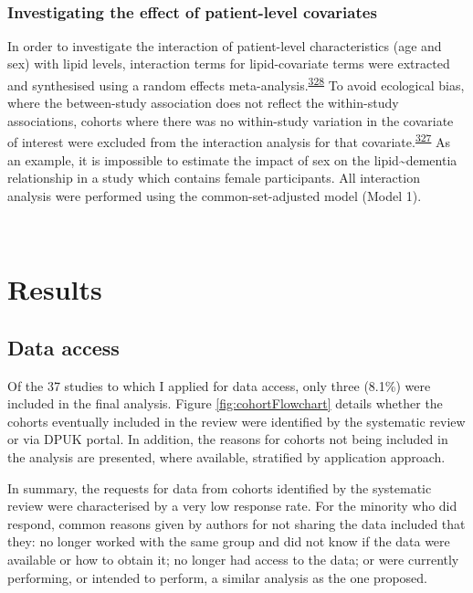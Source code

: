 \documentclass[a4paper, twoside]{templates/ociamthesis}
\begin{document}
~

\hypertarget{investigating-the-effect-of-patient-level-covariates}{%
\subsubsection{Investigating the effect of patient-level covariates}\label{investigating-the-effect-of-patient-level-covariates}}

In order to investigate the interaction of patient-level characteristics (age and sex) with lipid levels, interaction terms for lipid-covariate terms were extracted and synthesised using a random effects meta-analysis.\textsuperscript{\protect\hyperlink{ref-fisher2017}{328}} To avoid ecological bias, where the between-study association does not reflect the within-study associations, cohorts where there was no within-study variation in the covariate of interest were excluded from the interaction analysis for that covariate.\textsuperscript{\protect\hyperlink{ref-burke2017}{327}} As an example, it is impossible to estimate the impact of sex on the lipid\textasciitilde dementia relationship in a study which contains female participants. All interaction analysis were performed using the common-set-adjusted model (Model 1).

~

\hypertarget{results-2}{%
\section{Results}\label{results-2}}

\hypertarget{data-access}{%
\subsection{Data access}\label{data-access}}

Of the 37 studies to which I applied for data access, only three (8.1\%) were included in the final analysis. Figure \ref{fig:cohortFlowchart} details whether the cohorts eventually included in the review were identified by the systematic review or via DPUK portal. In addition, the reasons for cohorts not being included in the analysis are presented, where available, stratified by application approach.

In summary, the requests for data from cohorts identified by the systematic review were characterised by a very low response rate. For the minority who did respond, common reasons given by authors for not sharing the data included that they: no longer worked with the same group and did not know if the data were available or how to obtain it; no longer had access to the data; or were currently performing, or intended to perform, a similar analysis as the one proposed.
\end{document}
